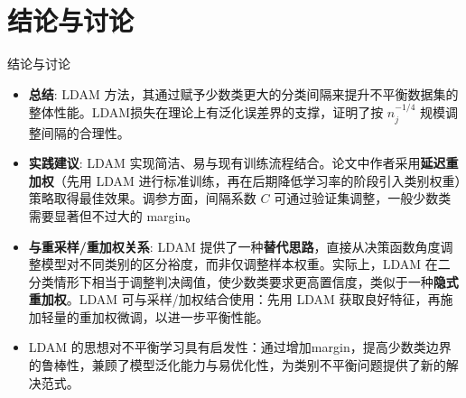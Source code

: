 \documentclass{beamer}
\begin{document}
\section{结论与讨论}
\begin{frame}{结论与讨论}
    \begin{itemize}
        \item \textbf{总结}: LDAM 方法，其通过赋予少数类更大的分类间隔来提升不平衡数据集的整体性能。LDAM损失在理论上有泛化误差界的支撑，证明了按 $n_j^{-1/4}$ 规模调整间隔的合理性。
        \item \textbf{实践建议}: LDAM 实现简洁、易与现有训练流程结合。论文中作者采用\textbf{延迟重加权}（先用 LDAM 进行标准训练，再在后期降低学习率的阶段引入类别权重）策略取得最佳效果。调参方面，间隔系数 $C$ 可通过验证集调整，一般少数类需要显著但不过大的 margin。
        \item \textbf{与重采样/重加权关系}: LDAM 提供了一种\textbf{替代思路}，直接从决策函数角度调整模型对不同类别的区分裕度，而非仅调整样本权重。实际上，LDAM 在二分类情形下相当于调整判决阈值，使少数类要求更高置信度，类似于一种\textbf{隐式重加权}。LDAM 可与采样/加权结合使用：先用 LDAM 获取良好特征，再施加轻量的重加权微调，以进一步平衡性能。
        \item LDAM 的思想对不平衡学习具有启发性：通过增加margin，提高少数类边界的鲁棒性，兼顾了模型泛化能力与易优化性，为类别不平衡问题提供了新的解决范式。
    \end{itemize}
\end{frame}
\end{document}

